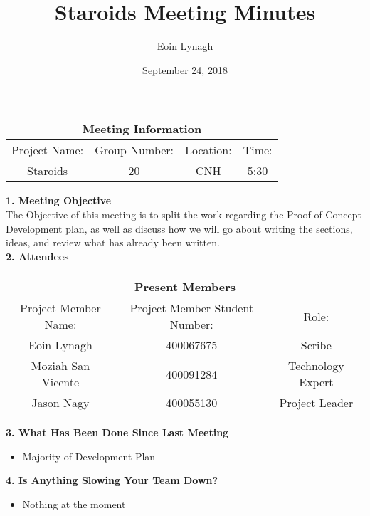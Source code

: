 \documentclass[12pt]{article}
\title{Staroids Meeting Minutes}
\author{Eoin Lynagh}
\date{September 24, 2018}
\begin{document}
\maketitle
\begin{center}
 \begin{tabular}{|c | c | c |  c |} 
 \hline
 \multicolumn{4}{|c|}{Meeting Information} \\
\hline
 Project Name: & Group Number: & Location: & Time: \\ 
 \hline
 Staroids & 20 & CNH & 5:30 \\
\hline
\end{tabular}
\end{center}
\begin{flushleft}


\textbf{1. Meeting Objective}\\
The Objective of this meeting is to split the work regarding the Proof of Concept Development plan, as well as discuss how we will go about writing the sections, ideas, and review what has already been written.\\

\textbf{2. Attendees}\\
\begin{center}
 \begin{tabular}{|c | c | c | } 
 \hline
 \multicolumn{3}{|c|}{Present Members} \\
\hline
 Project Member Name: & Project Member Student Number: & Role: \\ 
 \hline\hline
 Eoin Lynagh & 400067675 & Scribe \\
\hline
Moziah San Vicente & 400091284 & Technology Expert \\
\hline
 Jason Nagy & 400055130 & Project Leader \\
\hline
\end{tabular}
\end{center}

\textbf{3. What Has Been Done Since Last Meeting}\\
\begin{itemize}
\item Majority of Development Plan
\end{itemize}

\textbf{4. Is Anything Slowing Your Team Down?}\\
\begin{itemize}
\item Nothing at the moment
\end{itemize}


\end{flushleft}
\end{document}
